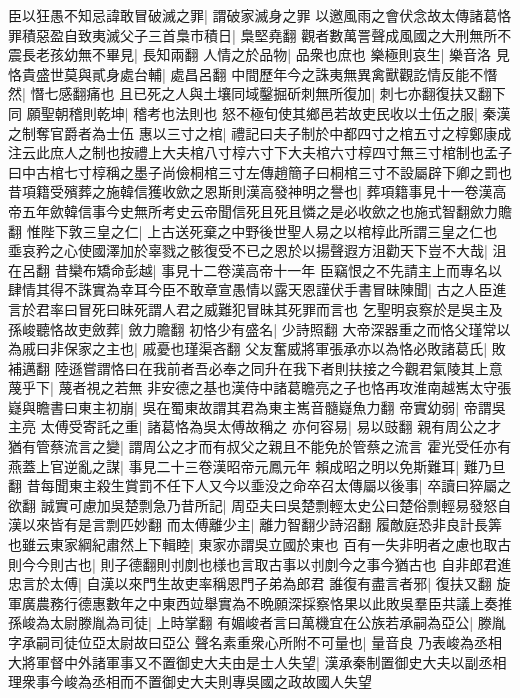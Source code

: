 臣以狂愚不知忌諱敢冒破滅之罪|{
	謂破家滅身之罪}
以邀風雨之會伏念故太傳諸葛恪罪積惡盈自致夷滅父子三首梟市積日|{
	梟堅堯翻}
觀者數萬詈聲成風國之大刑無所不震長老孩幼無不畢見|{
	長知兩翻}
人情之於品物|{
	品衆也庶也}
樂極則哀生|{
	樂音洛}
見恪貴盛世莫與貳身處台輔|{
	處昌呂翻}
中間歷年今之誅夷無異禽獸觀訖情反能不憯然|{
	憯七感翻痛也}
且已死之人與土壤同域鑿掘斫刺無所復加|{
	刺七亦翻復扶又翻下同}
願聖朝稽則乾坤|{
	稽考也法則也}
怒不極旬使其鄉邑若故吏民收以士伍之服|{
	秦漢之制奪官爵者為士伍}
惠以三寸之棺|{
	禮記曰夫子制於中都四寸之棺五寸之椁鄭康成注云此庶人之制也按禮上大夫棺八寸椁六寸下大夫棺六寸椁四寸無三寸棺制也孟子曰中古棺七寸椁稱之墨子尚儉桐棺三寸左傳趙簡子曰桐棺三寸不設屬辟下卿之罰也}
昔項籍受殯葬之施韓信獲收歛之恩斯則漢高發神明之譽也|{
	葬項籍事見十一卷漢高帝五年歛韓信事今史無所考史云帝聞信死且死且憐之是必收歛之也施式智翻歛力贍翻}
惟陛下敦三皇之仁|{
	上古送死棄之中野後世聖人易之以棺椁此所謂三皇之仁也}
埀哀矜之心使國澤加於辜戮之骸復受不已之恩於以揚聲遐方沮勸天下豈不大哉|{
	沮在呂翻}
昔欒布矯命彭越|{
	事見十二卷漢高帝十一年}
臣竊恨之不先請主上而專名以肆情其得不誅實為幸耳今臣不敢章宣愚情以露天恩謹伏手書冒昧陳聞|{
	古之人臣進言於君率曰冒死曰昧死謂人君之威難犯冒昧其死罪而言也}
乞聖明哀察於是吳主及孫峻聽恪故吏斂葬|{
	斂力贍翻}
初恪少有盛名|{
	少詩照翻}
大帝深器重之而恪父瑾常以為戚曰非保家之主也|{
	戚憂也瑾渠吝翻}
父友奮威將軍張承亦以為恪必敗諸葛氏|{
	敗補邁翻}
陸遜嘗謂恪曰在我前者吾必奉之同升在我下者則扶接之今觀君氣陵其上意蔑乎下|{
	蔑者視之若無}
非安德之基也漢侍中諸葛瞻亮之子也恪再攻淮南越嶲太守張嶷與瞻書曰東主初崩|{
	吳在蜀東故謂其君為東主嶲音髓嶷魚力翻}
帝實幼弱|{
	帝謂吳主亮}
太傅受寄託之重|{
	諸葛恪為吳太傅故稱之}
亦何容易|{
	易以豉翻}
親有周公之才猶有管蔡流言之變|{
	謂周公之才而有叔父之親且不能免於管蔡之流言}
霍光受任亦有燕蓋上官逆亂之謀|{
	事見二十三卷漢昭帝元鳳元年}
賴成昭之明以免斯難耳|{
	難乃旦翻}
昔每聞東主殺生賞罰不任下人又今以埀没之命卒召太傳屬以後事|{
	卒讀曰猝屬之欲翻}
誠實可慮加吳楚剽急乃昔所記|{
	周亞夫曰吳楚剽輕太史公曰楚俗剽輕易發怒自漢以來皆有是言剽匹妙翻}
而太傅離少主|{
	離力智翻少詩沼翻}
履敵庭恐非良計長筭也雖云東家綱紀肅然上下輯睦|{
	東家亦謂吳立國於東也}
百有一失非明者之慮也取古則今今則古也|{
	則子德翻則刌剫也様也言取古事以刌剫今之事今猶古也}
自非郎君進忠言於太傅|{
	自漢以來門生故吏率稱恩門子弟為郎君}
誰復有盡言者邪|{
	復扶又翻}
旋軍廣農務行德惠數年之中東西竝舉實為不晩願深採察恪果以此敗吳羣臣共議上奏推孫峻為太尉滕胤為司徒|{
	上時掌翻}
有媚峻者言曰萬機宜在公族若承嗣為亞公|{
	滕胤字承嗣司徒位亞太尉故曰亞公}
聲名素重衆心所附不可量也|{
	量音良}
乃表峻為丞相大將軍督中外諸軍事又不置御史大夫由是士人失望|{
	漢承秦制置御史大夫以副丞相理衆事今峻為丞相而不置御史大夫則專吳國之政故國人失望}
